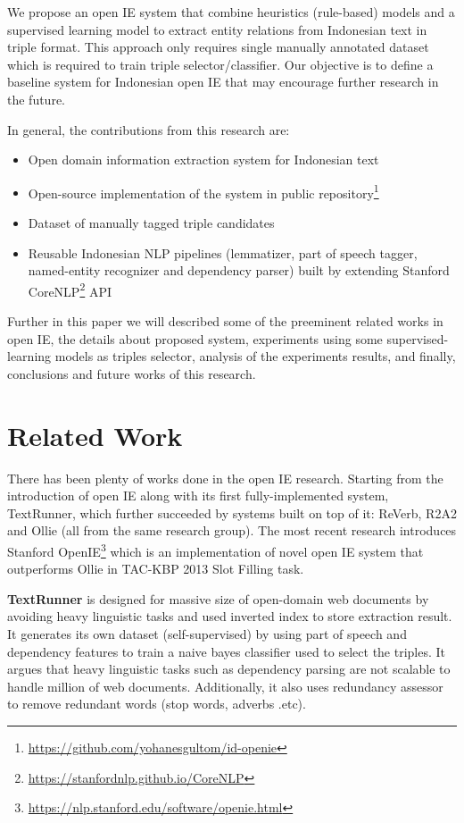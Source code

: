 \documentclass[peerreview,12pt]{IEEEtran}
\begin{document}
We propose an open IE system that combine heuristics (rule-based) models and a supervised learning model to extract entity relations from Indonesian text in triple format. This approach only requires single manually annotated dataset which is required to train triple selector/classifier. Our objective is to define a baseline system for Indonesian open IE that may encourage further research in the future.

In general, the contributions from this research are:

\begin{itemize}
\item Open domain information extraction system for Indonesian text
\item Open-source implementation of the system in public repository\footnote{\url{https://github.com/yohanesgultom/id-openie}}
\item Dataset of manually tagged triple candidates
\item Reusable Indonesian NLP pipelines (lemmatizer, part of speech tagger, named-entity recognizer and dependency parser) built by extending Stanford CoreNLP\footnote{\url{https://stanfordnlp.github.io/CoreNLP}} API
\end{itemize}

Further in this paper we will described some of the preeminent related works in open IE, the details about proposed system, experiments using some supervised-learning models as triples selector, analysis of the experiments results, and finally, conclusions and future works of this research.

\section{Related Work}

There has been plenty of works done in the open IE research. Starting from the introduction of open IE along with its first fully-implemented system, TextRunner\cite{banko2007open}, which further succeeded by systems built on top of it: ReVerb, R2A2\cite{etzioni2011open} and Ollie\cite{schmitz2012open} (all from the same research group). The most recent research introduces Stanford OpenIE\footnote{\url{https://nlp.stanford.edu/software/openie.html}} which is an implementation of novel open IE system that outperforms Ollie in TAC-KBP
2013 Slot Filling task\cite{angeli2015leveraging}.

\textbf{TextRunner} is designed for massive size of open-domain web documents by avoiding heavy linguistic tasks and used inverted index to store extraction result\cite{banko2007open}. It generates its own dataset (self-supervised) by using part of speech and dependency features to train a naive bayes classifier used to select the triples. It argues that heavy linguistic tasks such as dependency parsing are not scalable to handle million of web documents. Additionally, it also uses redundancy assessor to remove redundant words (stop words, adverbs .etc).
\end{document}
